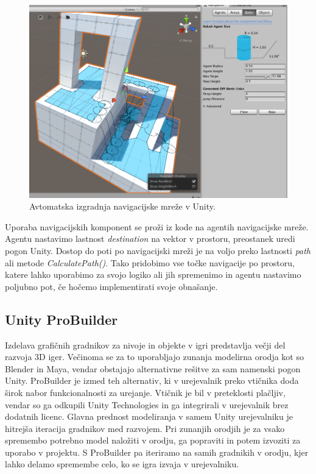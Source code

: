 \documentclass[12pt,a4paper,twoside]{book}
\begin{document}
\begin{figure}[h]
	\centering
	\includegraphics[width=15cm]{navmesh}
	\caption{Avtomatska izgradnja navigacijske mreže v Unity.}
	\label{slika:navmesh}
\end{figure}

Uporaba navigacijskih komponent se proži iz kode na agentih navigacijske mreže. Agentu nastavimo lastnost \textit{destination} na vektor v prostoru, preostanek uredi pogon Unity. Dostop do poti po navigacijski mreži je na voljo preko lastnosti \textit{path} ali metode \textit{CalculatePath()}. Tako pridobimo vse točke navigacije po prostoru, katere lahko uporabimo za svojo logiko ali jih spremenimo in agentu nastavimo poljubno pot, če hočemo implementirati svoje obnašanje. 

\subsection{Unity ProBuilder}
Izdelava grafičnih gradnikov za nivoje in objekte v igri predstavlja večji del razvoja 3D iger. Večinoma se za to uporabljajo zunanja modelirna orodja kot so Blender in Maya, vendar obstajajo alternativne rešitve za sam namenski pogon Unity. ProBuilder je izmed teh alternativ, ki v urejevalnik preko vtičnika doda širok nabor funkcionalnosti za urejanje. Vtičnik je bil v preteklosti plačljiv, vendar so ga odkupili Unity Technologies in ga integrirali v urejevalnik brez dodatnih licenc. Glavna prednost modeliranja v samem Unity urejevalniku je hitrejša iteracija gradnikov med razvojem. Pri zunanjih orodjih je za vsako spremembo potrebno model naložiti v orodju, ga popraviti in potem izvoziti za uporabo v projektu. S ProBuilder pa iteriramo na samih gradnikih v orodju, kjer lahko delamo spremembe celo, ko se igra izvaja v urejevalniku.
\end{document}
